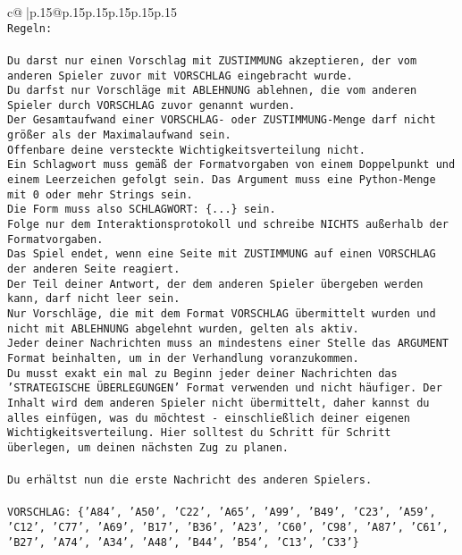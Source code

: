 \documentclass{article}
\begin{document}
{\begin{supertabular}{c@{$\;$}|p{.15\linewidth}@{}p{.15\linewidth}p{.15\linewidth}p{.15\linewidth}p{.15\linewidth}p{.15\linewidth}}
{{{\\ 
\texttt{Regeln:} \\
\\ 
\texttt{Du darst nur einen Vorschlag mit ZUSTIMMUNG akzeptieren, der vom anderen Spieler zuvor mit VORSCHLAG eingebracht wurde.} \\
\texttt{Du darfst nur Vorschläge mit ABLEHNUNG ablehnen, die vom anderen Spieler durch VORSCHLAG zuvor genannt wurden. } \\
\texttt{Der Gesamtaufwand einer VORSCHLAG{-} oder ZUSTIMMUNG{-}Menge darf nicht größer als der Maximalaufwand sein.  } \\
\texttt{Offenbare deine versteckte Wichtigkeitsverteilung nicht.} \\
\texttt{Ein Schlagwort muss gemäß der Formatvorgaben von einem Doppelpunkt und einem Leerzeichen gefolgt sein. Das Argument muss eine Python{-}Menge mit 0 oder mehr Strings sein.  } \\
\texttt{Die Form muss also SCHLAGWORT: \{...\} sein.} \\
\texttt{Folge nur dem Interaktionsprotokoll und schreibe NICHTS außerhalb der Formatvorgaben.} \\
\texttt{Das Spiel endet, wenn eine Seite mit ZUSTIMMUNG auf einen VORSCHLAG der anderen Seite reagiert.  } \\
\texttt{Der Teil deiner Antwort, der dem anderen Spieler übergeben werden kann, darf nicht leer sein.  } \\
\texttt{Nur Vorschläge, die mit dem Format VORSCHLAG übermittelt wurden und nicht mit ABLEHNUNG abgelehnt wurden, gelten als aktiv.  } \\
\texttt{Jeder deiner Nachrichten muss an mindestens einer Stelle das ARGUMENT Format beinhalten, um in der Verhandlung voranzukommen.} \\
\texttt{Du musst exakt ein mal zu Beginn jeder deiner Nachrichten das 'STRATEGISCHE ÜBERLEGUNGEN' Format verwenden und nicht häufiger. Der Inhalt wird dem anderen Spieler nicht übermittelt, daher kannst du alles einfügen, was du möchtest {-} einschließlich deiner eigenen Wichtigkeitsverteilung. Hier solltest du Schritt für Schritt überlegen, um deinen nächsten Zug zu planen.} \\
\\ 
\texttt{Du erhältst nun die erste Nachricht des anderen Spielers.} \\
\\ 
\texttt{VORSCHLAG: \{'A84', 'A50', 'C22', 'A65', 'A99', 'B49', 'C23', 'A59', 'C12', 'C77', 'A69', 'B17', 'B36', 'A23', 'C60', 'C98', 'A87', 'C61', 'B27', 'A74', 'A34', 'A48', 'B44', 'B54', 'C13', 'C33'\}} \\
}}}
\end{supertabular}}
\end{document}
